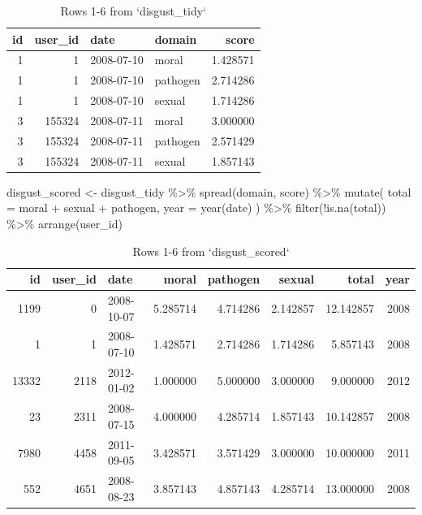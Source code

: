\documentclass[
  oneside]{book}
\newenvironment{Shaded}{\begin{snugshade}}{\end{snugshade}}
\newcommand{\AttributeTok}[1]{\textcolor[rgb]{0.77,0.63,0.00}{#1}}
\newcommand{\FunctionTok}[1]{\textcolor[rgb]{0.00,0.00,0.00}{#1}}
\newcommand{\NormalTok}[1]{#1}
\newcommand{\OtherTok}[1]{\textcolor[rgb]{0.56,0.35,0.01}{#1}}
\newcommand{\SpecialCharTok}[1]{\textcolor[rgb]{0.00,0.00,0.00}{#1}}
\begin{document}
\begin{table}

\caption{\label{tab:all-tidy}Rows 1-6 from `disgust_tidy`}
\centering
\begin{tabular}[t]{r|r|l|l|r}
\hline
id & user\_id & date & domain & score\\
\hline
1 & 1 & 2008-07-10 & moral & 1.428571\\
\hline
1 & 1 & 2008-07-10 & pathogen & 2.714286\\
\hline
1 & 1 & 2008-07-10 & sexual & 1.714286\\
\hline
3 & 155324 & 2008-07-11 & moral & 3.000000\\
\hline
3 & 155324 & 2008-07-11 & pathogen & 2.571429\\
\hline
3 & 155324 & 2008-07-11 & sexual & 1.857143\\
\hline
\end{tabular}
\end{table}

\begin{Shaded}
\begin{Highlighting}[]
\NormalTok{disgust\_scored }\OtherTok{\textless{}{-}}\NormalTok{ disgust\_tidy }\SpecialCharTok{\%\textgreater{}\%}
  \FunctionTok{spread}\NormalTok{(domain, score) }\SpecialCharTok{\%\textgreater{}\%}
  \FunctionTok{mutate}\NormalTok{(}
    \AttributeTok{total =}\NormalTok{ moral }\SpecialCharTok{+}\NormalTok{ sexual }\SpecialCharTok{+}\NormalTok{ pathogen,}
    \AttributeTok{year =} \FunctionTok{year}\NormalTok{(date)}
\NormalTok{  ) }\SpecialCharTok{\%\textgreater{}\%}
  \FunctionTok{filter}\NormalTok{(}\SpecialCharTok{!}\FunctionTok{is.na}\NormalTok{(total)) }\SpecialCharTok{\%\textgreater{}\%}
  \FunctionTok{arrange}\NormalTok{(user\_id) }
\end{Highlighting}
\end{Shaded}

\begin{table}

\caption{\label{tab:all-scored}Rows 1-6 from `disgust_scored`}
\centering
\begin{tabular}[t]{r|r|l|r|r|r|r|r}
\hline
id & user\_id & date & moral & pathogen & sexual & total & year\\
\hline
1199 & 0 & 2008-10-07 & 5.285714 & 4.714286 & 2.142857 & 12.142857 & 2008\\
\hline
1 & 1 & 2008-07-10 & 1.428571 & 2.714286 & 1.714286 & 5.857143 & 2008\\
\hline
13332 & 2118 & 2012-01-02 & 1.000000 & 5.000000 & 3.000000 & 9.000000 & 2012\\
\hline
23 & 2311 & 2008-07-15 & 4.000000 & 4.285714 & 1.857143 & 10.142857 & 2008\\
\hline
7980 & 4458 & 2011-09-05 & 3.428571 & 3.571429 & 3.000000 & 10.000000 & 2011\\
\hline
552 & 4651 & 2008-08-23 & 3.857143 & 4.857143 & 4.285714 & 13.000000 & 2008\\
\hline
\end{tabular}
\end{table}
\end{document}
